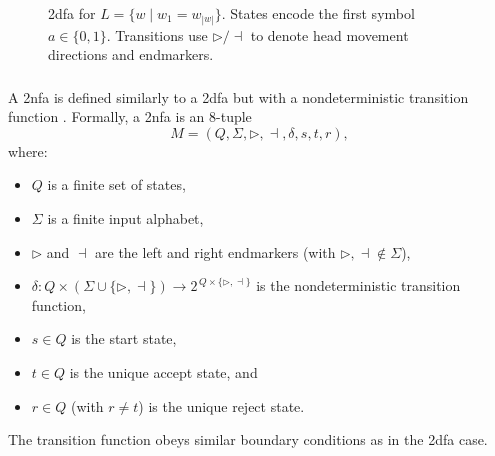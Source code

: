 \begin{figure}[ht]
    \centering  
    \caption{\gls{2dfa} for \(L = \{w \mid w_1 = w_{|w|}\}\). States encode the first symbol \(a \in \{0,1\}\). Transitions use \(\triangleright/\dashv\) to denote head movement directions and endmarkers.}
    \label{fig:2dfa-example}
\end{figure}

\subsubsection{}
\label{subsubsec:2nfa}

\begin{definition}
A \gls{2nfa} is defined similarly to a \gls{2dfa} but with a nondeterministic transition function \cite{sakoda1978nfas}. Formally, a \gls{2nfa} is an 8-tuple
\[
M = (Q, \Sigma, \triangleright, \dashv, \delta, s, t, r),
\]
where:
\begin{itemize}
    \item \(Q\) is a finite set of states,
    \item \(\Sigma\) is a finite input alphabet,
    \item \(\triangleright\) and \(\dashv\) are the left and right endmarkers (with \(\triangleright,\dashv \notin \Sigma\)),
    \item \(\delta: Q \times (\Sigma \cup \{\triangleright,\dashv\}) \to 2^{\,Q \times \{\triangleright,\dashv\}}\) is the nondeterministic transition function,
    \item \(s\in Q\) is the start state,
    \item \(t\in Q\) is the unique accept state, and
    \item \(r\in Q\) (with \(r\neq t\)) is the unique reject state.
\end{itemize}
The transition function obeys similar boundary conditions as in the \gls{2dfa} case.
\end{definition}

